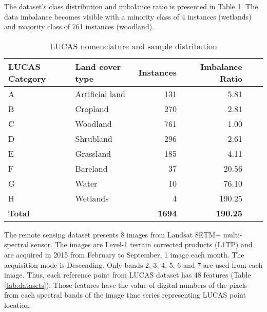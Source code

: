 \documentclass[remotesensing,article,submit,moreauthors,pdftex]{Definitions/mdpi}
\begin{document}
The dataset's class distribution and imbalance ratio is presented in Table
\ref{tab:dataset_classes}. The data imbalance becomes visible with a minority
class of 4 instances (wetlands) and majority class of 761 instances (woodland).

\begin{table}[H]
	\centering
	\begin{tabular}{llrrrr}
		\toprule
		\textbf{LUCAS Category} & \textbf{Land cover type} & \textbf{Instances}
		& \textbf{Imbalance Ratio} \\
		\hline
		A & Artificial land & 131 & 5.81 \\
		B & Cropland        & 270 & 2.81 \\
		C & Woodland        & 761 & 1.00 \\
		D & Shrubland       & 296 & 2.61 \\
		E & Grassland       & 185 & 4.11 \\
		F & Bareland        & 37  & 20.56 \\
		G & Water           & 10  & 76.10 \\
		H & Wetlands        & 4   & 190.25\\
		\hline
		\textbf{Total} & & \textbf{1694} &  \textbf{190.25} \\
		\bottomrule
	\end{tabular}
	\caption{\label{tab:dataset_classes}LUCAS nomenclature and sample distribution}
\end{table}

The remote sensing dataset presents 8 images from Landsat 8ETM+ multi-spectral
sensor. The images are Level-1 terrain corrected products (L1TP) and are
acquired in 2015 from February to September, 1 image each month. The acquisition
mode is Descending. Only bands 2, 3, 4, 5, 6 and 7 are used from each image.
Thus, each reference point from LUCAS dataset has 48 features (Table
\ref{tab:datasets}). Those features have the value of digital numbers of the
pixels from each spectral bands of the image time series representing LUCAS
point location.

\end{document}
